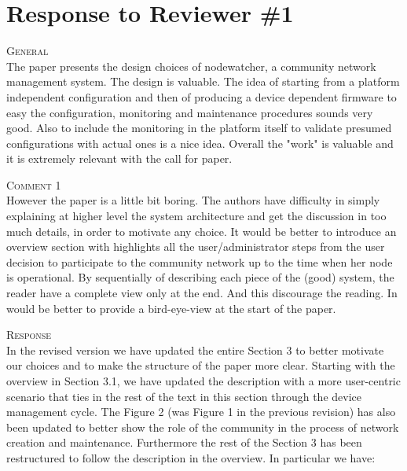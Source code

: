 \documentclass[12pt,twoside,a4paper]{report}
\begin{document}
\newpage

\section*{Response to Reviewer \#1}

\vspace{0.5cm}\noindent\textsc{General}\\
\noindent The paper presents  the design choices of nodewatcher, a community network management system. The design is valuable. The idea of starting from a platform independent configuration and then of producing a device dependent firmware to easy the configuration, monitoring and maintenance procedures sounds very good. Also to include the monitoring in the platform itself to validate presumed configurations with actual ones is a nice idea.
Overall the "work" is valuable and it is extremely relevant with the call for paper.

\vspace{0.5cm}\noindent\textsc{Comment 1}\\
However the paper is a little bit boring. The authors have difficulty in simply explaining at higher level the system architecture and get the discussion in too much details, in order to motivate any choice. It would be better to introduce an overview section with highlights all the user/administrator steps from the user decision to participate to the community network up to the time when her node is operational. By sequentially of describing each piece of the (good) system, the reader have a complete view only at the end. And this discourage the reading. In would be better to provide a bird-eye-view at the start of the paper. 

\vspace{0.2cm}\noindent\textsc{Response}\\
In the revised version we have updated the entire Section 3 to better motivate our choices and to make the structure of the paper more clear. Starting with the overview in Section 3.1, we have updated the description with a more user-centric scenario that ties in the rest of the text in this section through the device management cycle.
The Figure 2 (was Figure 1 in the previous revision) has also been updated to better show the role of the community in the process of network creation and maintenance. Furthermore the rest of the Section 3 has been restructured to follow the description in the overview. In particular we have:
\end{document}
